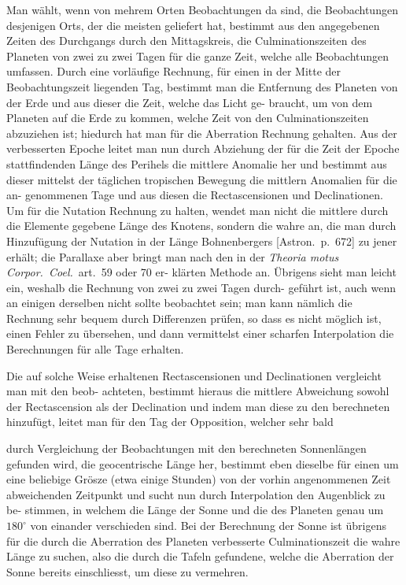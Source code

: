 \documentclass[12pt,a4paper]{article}
\begin{document}
Man w\"ahlt, wenn von mehrem Orten Beobachtungen da sind, die Beobachtungen desjenigen Orts,
der die meisten geliefert hat, bestimmt aus den angegebenen Zeiten des Durchgangs durch den Mittagskreis,
die Culminationszeiten des Planeten von zwei zu zwei Tagen f\"ur die ganze Zeit, welche alle Beobachtungen
umfassen. Durch eine vorl\"aufige Rechnung, f\"ur einen in der Mitte der Beobachtungszeit liegenden Tag,
bestimmt man die Entfernung des Planeten von der Erde und aus dieser die Zeit, welche das Licht ge-
braucht, um von dem Planeten auf die Erde zu kommen, welche Zeit von den Culminationszeiten abzuziehen
ist; hiedurch hat man f\"ur die Aberration Rechnung gehalten. Aus der verbesserten Epoche leitet man
nun durch Abziehung der f\"ur die Zeit der Epoche stattfindenden L\"ange des Perihels die mittlere Anomalie
her und bestimmt aus dieser mittelst der t\"aglichen tropischen Bewegung die mittlern Anomalien f\"ur die an-
genommenen Tage und aus diesen die Rectascensionen und Declinationen. Um f\"ur die Nutation Rechnung
zu halten, wendet man nicht die mittlere durch die Elemente gegebene L\"ange des Knotens, sondern die
wahre an, die man durch Hinzuf\"ugung der Nutation in der L\"ange Bohnenbergers [Astron.~p.~672] zu jener
erh\"alt; die Parallaxe aber bringt man nach den in der \textit{Theoria motus Corpor.~Coel.}~art.~59 oder 70 er-
kl\"arten Methode an. \"Ubrigens sieht man leicht ein, weshalb die Rechnung von zwei zu zwei Tagen durch-
gef\"uhrt ist, auch wenn an einigen derselben nicht sollte beobachtet sein; man kann n\"amlich die Rechnung
sehr bequem durch Differenzen pr\"ufen, so dass es nicht m\"oglich ist, einen Fehler zu \"ubersehen, und dann
vermittelst einer scharfen Interpolation die Berechnungen f\"ur alle Tage erhalten.

Die auf solche Weise erhaltenen Rectascensionen und Declinationen vergleicht man mit den beob-
achteten, bestimmt hieraus die mittlere Abweichung sowohl der Rectascension als der Declination und
indem man diese zu den berechneten hinzuf\"ugt, leitet man f\"ur den Tag der Opposition, welcher sehr bald

\newpage

durch Vergleichung der Beobachtungen mit den berechneten Sonnenl\"angen gefunden wird, die geocentrische
L\"ange her, bestimmt eben dieselbe f\"ur einen um eine beliebige Gr\"osze (etwa einige Stunden) von der vorhin
angenommenen Zeit abweichenden Zeitpunkt und sucht nun durch Interpolation den Augenblick zu be-
stimmen, in welchem die L\"ange der Sonne und die des Planeten genau um $180^\circ$ von einander verschieden
sind. Bei der Berechnung der Sonne ist \"ubrigens f\"ur die durch die Aberration des Planeten verbesserte
Culminationszeit die wahre L\"ange zu suchen, also die durch die Tafeln gefundene, welche die Aberration
der Sonne bereits einschliesst, um diese zu vermehren.
\end{document}
